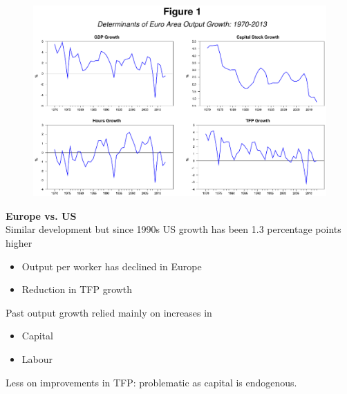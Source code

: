 \documentclass{beamer}
\begin{document}
\begin{frame}
  \begin{figure}
    \includegraphics[scale=.7]{growth_accounting2.eps}
  \end{figure}
\end{frame}

\begin{frame}
  \textbf{Europe vs. US}\\
  Similar development but since 1990s US growth has been 1.3 percentage points higher
  \begin{itemize}
    \item Output per worker has declined in Europe
    \item Reduction in TFP growth
  \end{itemize}
  \medskip
  Past output growth relied mainly on increases in
  \begin{itemize}
    \item Capital
    \item Labour
  \end{itemize}
  \medskip
  Less on improvements in TFP: problematic as capital is endogenous.
\end{frame}
\end{document}
